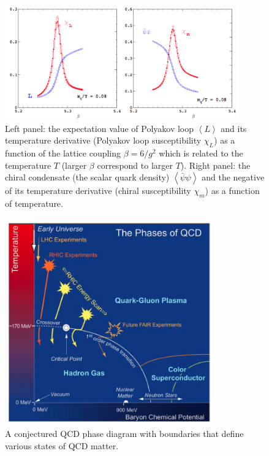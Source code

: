 \begin{figure}
\begin{centering}
\includegraphics[width=0.9\textwidth]{fig/1.Introduction/phase_transition_xsymmtry}
\par\end{centering}

\protect\caption{Left panel: the expectation value of Polyakov loop $\left\langle L\right\rangle $
and its temperature derivative (Polyakov loop susceptibility $\chi_{L}$)
as a function of the lattice coupling $\beta=6/g^{2}$ which is related
to the temperature $T$ (larger $\beta$ correspond to larger $T$).
Right panel: the chiral condensate (the scalar quark density) $\left\langle \bar{\psi}\psi\right\rangle $
and the negative of its temperature derivative (chiral susceptibility
$\chi_{m}$) as a function of temperature. \cite{PhysRevD.50.6954,Heinz:fk}}


\label{fig:ptxs}
\end{figure}


\begin{figure}
\begin{centering}
\includegraphics[width=0.8\textwidth]{fig/1.Introduction/QCD_Phase_diagram}
\par\end{centering}

\protect\caption{A conjectured QCD phase diagram with boundaries that define various
states of QCD matter. \cite{STAR-Collaboration:2014qf}}


\label{fig:Phase_diagram}
\end{figure}



